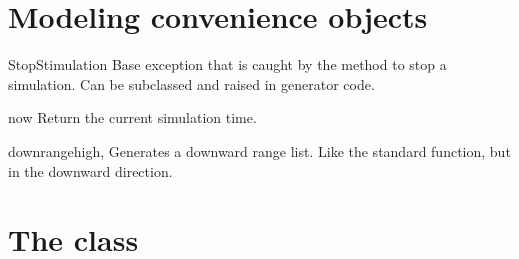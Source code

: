 \section{Modeling convenience objects}

\begin{excclassdesc}{StopStimulation}{}
Base exception that is caught by the  method to
stop a simulation. Can be subclassed and raised in generator code.
\end{excclassdesc}

\begin{funcdesc}{now}{}
Return the current simulation time.
\end{funcdesc}

\begin{funcdesc}{downrange}{high, }
Generates a downward range list. Like the standard 
function, but in the downward direction.
\end{funcdesc}

\section{The   class}






